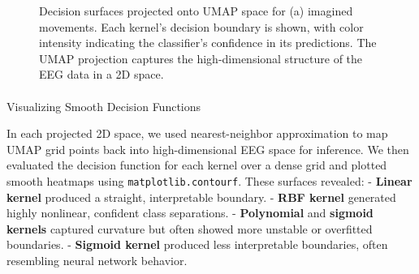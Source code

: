 \documentclass[
  letterpaper,
  DIV=11,
  numbers=noendperiod]{scrartcl}
\makeatletter
\let\oldparagraph\paragraph
\renewcommand{\paragraph}{
    \@ifstar
      \xxxParagraphStar
      \xxxParagraphNoStar
  }
\newcommand{\xxxParagraphStar}[1]{\oldparagraph*{#1}\mbox{}}
\newcommand{\xxxParagraphNoStar}[1]{\oldparagraph{#1}\mbox{}}
\makeatother
\begin{document}
\begin{figure}


\caption{\label{fig-decision-surfaces}Decision surfaces projected onto
UMAP space for (a) imagined movements. Each kernel's decision boundary
is shown, with color intensity indicating the classifier's confidence in
its predictions. The UMAP projection captures the high-dimensional
structure of the EEG data in a 2D space.}

\end{figure}%

\paragraph{Visualizing Smooth Decision
Functions}\label{visualizing-smooth-decision-functions}

In each projected 2D space, we used nearest-neighbor approximation to
map UMAP grid points back into high-dimensional EEG space for inference.
We then evaluated the decision function for each kernel over a dense
grid and plotted smooth heatmaps using \texttt{matplotlib.contourf}.
These surfaces revealed: - \textbf{Linear kernel} produced a straight,
interpretable boundary. - \textbf{RBF kernel} generated highly
nonlinear, confident class separations. - \textbf{Polynomial} and
\textbf{sigmoid kernels} captured curvature but often showed more
unstable or overfitted boundaries. - \textbf{Sigmoid kernel} produced
less interpretable boundaries, often resembling neural network behavior.
\end{document}
